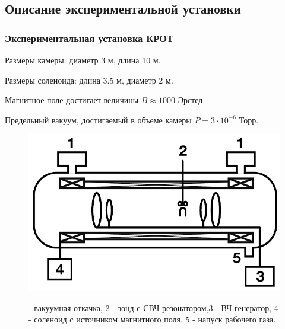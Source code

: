 \documentclass[10pt,pdf,hyperref={unicode}, dvipsnames]{beamer}
\begin{document}
\subsection{Описание экспериментальной установки}
\begin{frame}
	\frametitle{Экспериментальная установка КРОТ}
	Размеры камеры: диаметр 3 м, длина 10 м.

	Размеры соленоида: длина 3.5 м, диаметр 2 м. 
	
	Магнитное поле достигает величины $B\approx 1000$ Эрстед. 
	
	Предельный вакуум, достигаемый в объеме камеры $P =3\cdot10^{-6}$ Торр. 
	\begin{figure}[tb]
		\vspace{0pt}
		\centering
		\includegraphics[width=0.6\linewidth]{fig/krot}
		\label{fig:krot}
		\caption*{ - вакуумная откачка, 2 - зонд с СВЧ-резонатором,3 - ВЧ-генератор, 4 - соленоид с источником магнитного поля, 5 - напуск рабочего газа.}
	\end{figure}

\end{frame}
\end{document}
